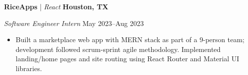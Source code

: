 \textbf{RiceApps} | \textit{React} \hfill \textbf{Houston, TX}\par
\textit{Software Engineer Intern} \hfill May 2023--Aug 2023

\begin{itemize}
    \item Built a marketplace web app with MERN stack as part of a 9-person team; development followed scrum-sprint agile methodology. Implemented landing/home pages and site routing using React Router and Material UI libraries.
\end{itemize}\par